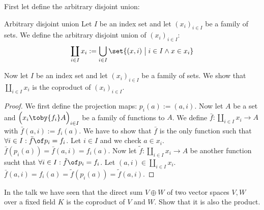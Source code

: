 \begin{answer}
  First let define the arbitrary disjoint union:
  \begin{definition}{Arbitrary disjoint union}
    Let $I$ be an index set and let $(x_i)_{i \in I}$ be a family of sets.
    We define the arbitrary disjoint union of $(x_i)_{i\in I}$:
    $$\coprod_{i \in I} {x_i} := \bigcup_{i \in I} \set{ (x, i) \;\big|\; i \in I \land x \in x_i}$$
  \end{definition}
  Now let $I$ be an index set and let $(x_i)_{i\in I}$ be a family of sets. We show that $\coprod_{i \in I} {x_i}$ is the coproduct of $(x_i)_{i\in I}$.
  \begin{proof}
    We first define the projection maps: $p_i(a) := (a, i)$.
    Now let $A$ be a set and $\Bigl(x_i \toby{f_i} A\Bigr)_{i \in I}$ be a family of functions to $A$.
    We define $\bar{f} : \coprod_{i \in I} {x_i} \to A$ with $\bar{f}(a, i) := f_i(a)$.
    We have to show that $\bar{f}$ is the only function such that
    $\forall i \in I: \bar{f} \of p_i = f_i$.
    Let $i \in I$ and we check $a \in x_i$. $\bar{f}(p_i(a)) = \bar{f}(a,i) = f_i(a)$.
    Now let $\tilde{f} : \coprod_{i \in I} {x_i} \to A$ be another function sucht that
    $\forall i \in I: \tilde{f} \of p_i = f_i$.
    Let $(a, i) \in \coprod_{i \in I} {x_i}$. $\bar{f}(a,i)= f_i(a) = \tilde{f}(p_i(a)) = \tilde{f}(a,i)$.\qedhere
  \end{proof}
\end{answer}

\begin{exercise}
  In the talk we have seen that the direct sum $V \oplus W$ of two vector spaces $V, W$ over a fixed field $K$ is the coproduct of $V$ and $W$.
  Show that it is also the product.
\end{exercise}

